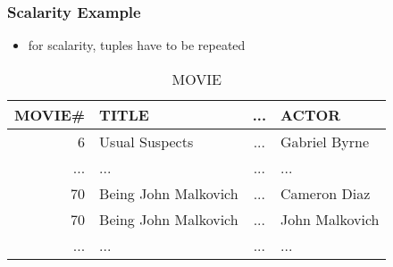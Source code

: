 \documentclass[dvipsnames]{beamer}
\theoremstyle{plain}
\begin{document}
\begin{frame}
  \frametitle{Scalarity Example}

  \begin{itemize}
    \item for scalarity, tuples have to be repeated
  \end{itemize}

  \begin{footnotesize}
  \begin{table}
    \caption{MOVIE}
    \begin{tabular}{|r|l|c|l|}\hline
MOVIE\# & TITLE                & ... & ACTOR         \\\hline\hline
      6 & Usual Suspects       & ... & Gabriel Byrne \\\hline
    ... & ...                  & ... & ...           \\\hline
     70 & Being John Malkovich & ... & Cameron Diaz  \\\hline
     70 & Being John Malkovich & ... & John Malkovich\\\hline
    ... & ...                  & ... & ...           \\\hline
    \end{tabular}
  \end{table}
  \end{footnotesize}
\end{frame}
\end{document}

